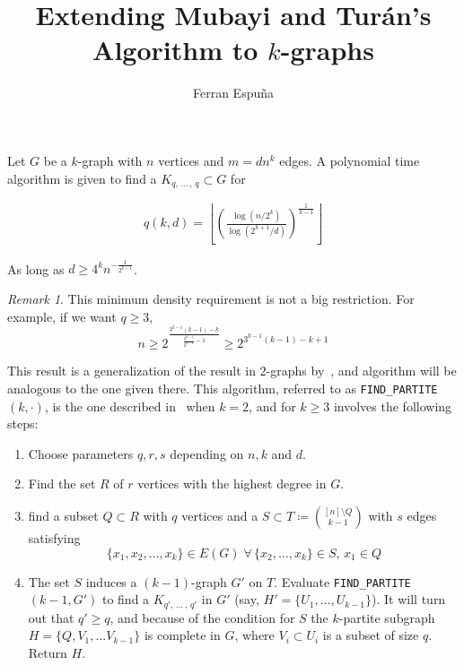 \documentclass[12pt]{article}
\author{Ferran Espuña}
\date{} %
\theoremstyle{remark}
\newtheorem{remark}[thm]{Remark}
\begin{document}
    \title{Extending Mubayi and Turán's Algorithm to $k$-graphs}

    \maketitle

    Let $G$ be a $k$-graph with $n$ vertices and $m = dn^k$ edges.
    A polynomial time algorithm is given to find a $K_{q,\, \ldots\, ,\, q} \subset G$ for

    \begin{align*}
        q (k, d) = \left\lfloor \left(  \frac{\log (n/2^k)}{\log (2^{k+1}/d)} \right)^{\frac{1}{k-1}} \right\rfloor
        \label{eq:q}
    \end{align*}

    As long as $d \geq 4^k n^{-\frac{1}{2^{k-1}}}$.

    \begin{remark}
        This minimum density requirement is not a big restriction.
        For example, if we want $q \geq 3$,
        \[
            n \geq 2^{\frac{3^{k-1}(k-1)-k}{\frac{3^{k-1}}{2^{k-1}}-1}} \geq 2^{3^{k-1}(k-1)-k+1}
        \]
    \end{remark}

    This result is a generalization of the result in $2$-graphs by~\cite{MUBAYI2010174},
    and algorithm will be analogous to the one given there.
    This algorithm, referred to as \verb|FIND_PARTITE|$(k, \cdot)$,
    is the one described in~\cite{MUBAYI2010174}
    when $k=2$, and for $k \geq 3$ involves the following steps:

    \begin{enumerate}
        \item Choose parameters $q, r, s$ depending on $n, k$ and $d$. \label{step:choose_parameters}

        \item Find the set $R$ of $r$ vertices with the highest degree in $G$. \label{step:find_R}

        \item find a subset $Q \subset R$ with $q$ vertices and a
        $S \subset T \coloneqq \binom{[n] \setminus Q}{k-1}$ with $s$ edges satisfying
        \[\{x_1, x_2, \ldots, x_k\} \in E(G) \; \forall \, \{x_2, \ldots, x_k\} \in S, \, x_1 \in Q\] \label{step:find_Q_S}

        \item The set $S$ induces a $(k-1)$-graph $G'$ on $T$.
        Evaluate \verb|FIND_PARTITE|$(k-1, G')$ to find a $K_{q',\, \ldots\, ,\, q'}$ in $G'$
        (say, $H' = \{U_1, \ldots, U_{k-1}\}$). It will turn out that $q' \geq q$,
        and because of the condition for $S$ the $k$-partite subgraph $H = \{Q, V_1, \ldots V_{k-1}\}$
        is complete in $G$, where $V_i \subset U_i$ is a subset of size $q$.
        Return $H$.

    \end{enumerate}
\end{document}

